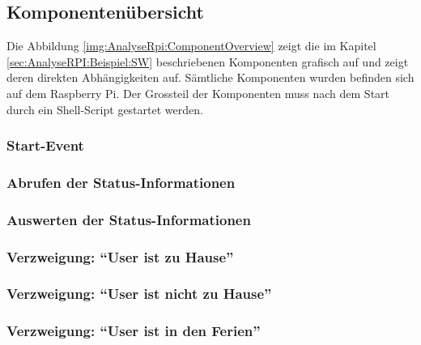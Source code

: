 \begin{itemize}

\end{itemize}


\subsection{Komponentenübersicht}
Die Abbildung \ref{img:AnalyseRpi:ComponentOverview}  zeigt die im Kapitel \ref{sec:AnalyseRPI:Beispiel:SW}  beschriebenen Komponenten grafisch auf und zeigt deren direkten Abhängigkeiten auf. Sämtliche Komponenten wurden befinden sich auf dem Raspberry Pi. Der Grossteil der Komponenten muss nach dem Start durch ein Shell-Script gestartet werden.

\subsubsection{Start-Event}

\subsubsection{Abrufen der Status-Informationen}

\subsubsection{Auswerten der Status-Informationen}

\subsubsection{Verzweigung: "`User ist zu Hause"'}

\subsubsection{Verzweigung: "`User ist nicht zu Hause"'}

\subsubsection{Verzweigung: "`User ist in den Ferien"'}


